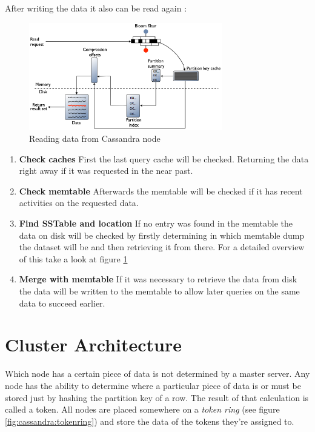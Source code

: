 After writing the data it also can be read again \autocite{datastaxReadData}:
\begin{figure}[ht]
    \centering
    \includegraphics[width=0.75\textwidth]{img/cassandra_local_read.png}
    \caption{Reading data from Cassandra node \autocite{datastaxReadData}}
    \label{fig:cassandra:readData}
\end{figure}
\begin{enumerate}
    \item \textbf{Check caches} First the last query cache will be checked. Returning the data right away if it was requested in the near past.
    \item \textbf{Check memtable} Afterwards the memtable will be checked if it has recent activities on the requested data.
    \item \textbf{Find SSTable and location} If no entry was found in the memtable the data on disk will be checked by firstly determining in which memtable dump the dataset will be and then retrieving it from there. For a detailed overview of this take a look at figure \ref{fig:cassandra:readData}
    \item \textbf{Merge with memtable} If it was necessary to retrieve the data from disk the data will be written to the memtable to allow later queries on the same data to succeed earlier.
\end{enumerate}

\section{Cluster Architecture}\label{sec:CassandraClusterArchitecture}  %
Which node has a certain piece of data is not determined by a master server. Any node has the ability to determine where a particular piece of data is or must be stored just by hashing the partition key of a row. The result of that calculation is called a token. All nodes are placed somewhere on a \textit{token ring} (see figure \ref{fig:cassandra:tokenring}) and store the data of the tokens they're assigned to.

